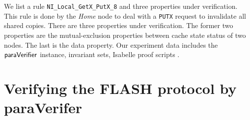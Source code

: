 \documentclass{llncs-new}
\newlength{\fminilength}
\newenvironment{fmini}[1][\linewidth]
  {\setlength{\fminilength}{#1\fboxsep-2\fboxrule}%
   \vspace{2ex}\noindent\begin{lrbox}{\fminibox}\begin{minipage}{\fminilength}%
   \mbox{ }\hfill\vspace{-2.5ex}}%
  {\end{minipage}\end{lrbox}\vspace{1ex}\hspace{0ex}%
   \framebox{\usebox{\fminibox}}}
\newenvironment{specification}
{\noindent\scriptsize
\tt\begin{fmini}\begin{tabbing}X\=X12345\=XXXX\=XXXX\=XXXX\=XXXX\=XXXX
\=\+\kill} {\end{tabbing}\normalfont\end{fmini}}
\newcommand{\forget}[1]{}
\begin{document}
We list a rule {\tt NI\_Local\_GetX\_PutX\_8} and three properties under verification. This rule is done by the \emph{Home} node to deal with a {\tt PUTX} request to invalidate all shared copies. There are three properties under verification.  The former two properties are the mutual-exclusion properties between  cache state status of two nodes. The last is the  data property. Our experiment data includes the
${\sf paraVerifier}$ instance, invariant sets, Isabelle proof
scripts \cite{LiCache16a}.

\forget{
\begin{specification}
invariant "CacheStateProp"\\
  forall p : NODE do forall q : NODE do     p != q ->\\
    !(Sta.Proc[p].CacheState = CACHE\_E \& Sta.Proc[q].CacheState = CACHE\_E)\\
  end end;\\

invariant "CacheStatePropHome"\\
  forall p : NODE do\\
    !(Sta.Proc[p].CacheState = CACHE\_E \& Sta.HomeProc.CacheState = CACHE\_E)\\
  end;\\

invariant "MemDataProp"\\
  !((Sta.Dir.Dirty = FALSE) \& (!(Sta.MemData = Sta.CurrData)));
\end{specification}
}

\section{Verifying the FLASH protocol by {\sf paraVerifer} \label{sec:experiments}}
\end{document}
